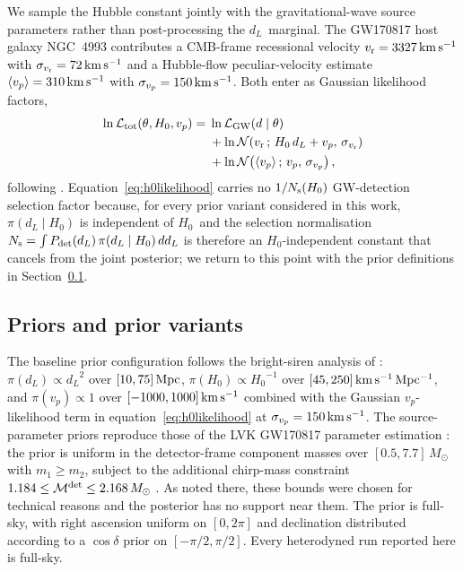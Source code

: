 \documentclass[usenatbib]{mnras}
\newcommand{\kmsmpc}{\ensuremath{\,\rm km\,s^{-1}\,Mpc^{-1}}\xspace}
\newcommand{\kms}{\ensuremath{\,\rm km\,s^{-1}}\xspace}
\newcommand{\hzero}{\ensuremath{H_{0}}\xspace}
\newcommand{\dL}{\ensuremath{d_{L}}\xspace}
\newcommand{\sigmavp}{\ensuremath{\sigma_{v_p}}\xspace}
\begin{document}
We sample the Hubble constant jointly with the gravitational-wave source parameters rather than post-processing the \dL\ marginal. The GW170817 host galaxy NGC~4993 contributes a CMB-frame recessional velocity $v_{\rm r}=3327\kms$ with $\sigma_{v_{\rm r}}=72\kms$ and a Hubble-flow peculiar-velocity estimate $\langle v_{p}\rangle=310\kms$ with $\sigmavp=150\kms$. Both enter as Gaussian likelihood factors,
\begin{equation}
\begin{split}
\ln\mathcal{L}_{\rm tot}(\theta,\hzero,v_{p}) = {}& \ln\mathcal{L}_{\rm GW}(d\mid\theta) \\
&+ \ln\mathcal{N}\!\left(v_{\rm r}\,;\,\hzero\,\dL+v_{p},\,\sigma_{v_{\rm r}}\right) \\
&+ \ln\mathcal{N}\!\left(\langle v_{p}\rangle\,;\,v_{p},\,\sigmavp\right) ,
\end{split}
\label{eq:h0likelihood}
\end{equation}
following \citet{Abbott2017H0}. Equation~\ref{eq:h0likelihood} carries no $1/N_{\rm s}(\hzero)$ GW-detection selection factor because, for every prior variant considered in this work, $\pi(\dL\mid\hzero)$ is independent of \hzero\ and the selection normalisation $N_{\rm s}=\int P_{\rm det}(\dL)\,\pi(\dL\mid\hzero)\,d\dL$ is therefore an \hzero-independent constant that cancels from the joint posterior; we return to this point with the prior definitions in Section~\ref{sec:priors}.

\subsection{Priors and prior variants}
\label{sec:priors}

The baseline prior configuration follows the bright-siren analysis of \citet{Abbott2017H0}: $\pi(\dL)\propto\dL^{2}$ over $[10,75]\,\rm Mpc$, $\pi(\hzero)\propto\hzero^{-1}$ over $[45,250]\kmsmpc$, and $\pi(v_{p})\propto 1$ over $[-1000,1000]\kms$ combined with the Gaussian $v_{p}$-likelihood term in equation~\ref{eq:h0likelihood} at $\sigmavp=150\kms$. The source-parameter priors reproduce those of the LVK GW170817 parameter estimation \citep{Abbott2019GW170817Properties}: the prior is uniform in the detector-frame component masses over $[0.5,7.7]\,M_{\odot}$ with $m_{1}\ge m_{2}$, subject to the additional chirp-mass constraint $1.184\le\mathcal{M}^{\rm det}\le 2.168\,M_{\odot}$ \citep[][Sec.~III\,D]{Abbott2019GW170817Properties}. As noted there, these bounds were chosen for technical reasons and the posterior has no support near them. The prior is full-sky, with right ascension uniform on $[0,2\pi]$ and declination distributed according to a $\cos\delta$ prior on $[-\pi/2,\pi/2]$. Every heterodyned run reported here is full-sky.
\end{document}
